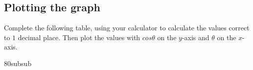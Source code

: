 \subsection*{Plotting the graph}
\nopagebreak
 Complete the following table, using your calculator to calculate the values correct to $1$ decimal place. Then plot the values with $cos\theta $ on the $y$-axis and $\theta $ on the $x$-axis.\par 
\setlength\mytablespace{16\tabcolsep}
\addtolength\mytablespace{9\arrayrulewidth}
\setlength\mytablewidth{\linewidth}
\setlength\mytableroom{\mytablewidth}
\addtolength\mytableroom{-\mytablespace}
\setlength\myfixedwidth{0pt}
\setlength\mystarwidth{\mytableroom}
\addtolength\mystarwidth{-\myfixedwidth}
\divide\mystarwidth 80subsub
